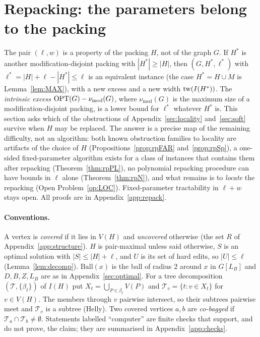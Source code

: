 \section{Repacking: the parameters belong to the packing}\label{sec:repack}
The pair $(\ell,w)$ is a property of the packing $H$, not of the graph $G$. If $H^*$ is another modification-disjoint packing with $|H^*|\ge|H|$, then $(G,H^*,\ell^*)$ with $\ell^*=|H|+\ell-|H^*|\le\ell$ is an equivalent instance (the case $H^*=H\cup M$ is Lemma~\ref{lem:MAX}), with a new excess and a new width $\mathrm{tw}(I(H^*))$. The \emph{intrinsic excess} $\mathrm{OPT}(G)-\nu_{\mathrm{mod}}(G)$, where $\nu_{\mathrm{mod}}(G)$ is the maximum size of a modification-disjoint packing, is a lower bound for $\ell^*$ whatever $H^*$ is. This section asks which of the obstructions of Appendix~\ref{sec:locality} and~\ref{sec:soft} survive when $H$ may be replaced. The answer is a precise map of the remaining difficulty, not an algorithm: both known obstruction families to locality are artifacts of the choice of $H$ (Propositions~\ref{prop:rpFAR} and~\ref{prop:rpSp}), a one-sided fixed-parameter algorithm exists for a class of instances that contains them after repacking (Theorem~\ref{thm:rpPL}), no polynomial repacking procedure can have bounds in $\ell$ alone (Theorem~\ref{thm:rpN}), and what remains is to \emph{locate} the repacking (Open Problem~\ref{op:LOC}). Fixed-parameter tractability in $\ell+w$ stays open. All proofs are in Appendix~\ref{app:repack}.

\paragraph{Conventions.}
A vertex is \emph{covered} if it lies in $V(H)$ and \emph{uncovered} otherwise (the set $R$ of Appendix~\ref{app:structure}). $H$ is pair-maximal unless said otherwise, $S$ is an optimal solution with $|S|\le|H|+\ell$, and $U$ is its set of hard edits, so $|U|\le\ell$ (Lemma~\ref{lem:decomp}). $\mathrm{Ball}(x)$ is the ball of radius $2$ around $x$ in $G[L_B]$ and $D,B,Z,L_B$ are as in Appendix~\ref{sec:optimal}. For a tree decomposition $(\mathcal T,\{\beta_t\})$ of $I(H)$ put $X_t=\bigcup_{P\in\beta_t}V(P)$ and $\mathcal T_v=\{t:v\in X_t\}$ for $v\in V(H)$. The members through $v$ pairwise intersect, so their subtrees pairwise meet and $\mathcal T_v$ is a subtree (Helly). Two covered vertices $a,b$ are \emph{co-bagged} if $\mathcal T_a\cap\mathcal T_b\neq\emptyset$. Statements labelled ``computer'' are finite checks that support, and do not prove, the claim; they are summarised in Appendix~\ref{app:checks}.

